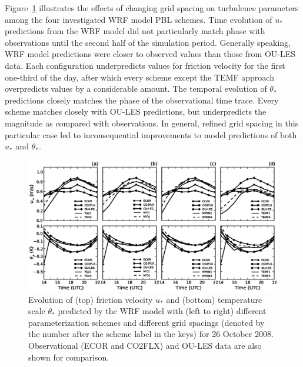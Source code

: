 Figure~\ref{figure421} illustrates the effects of changing grid spacing on turbulence parameters among the four investigated WRF model PBL schemes. Time evolution of $u_*$ predictions from the WRF model did not particularly match phase with observations until the second half of the simulation period. Generally speaking, WRF model predictions were closer to observed values than those from OU-LES data. Each configuration underpredicts values for friction velocity for the first one-third of the day, after which every scheme except the TEMF approach overpredicts values by a considerable amount. The temporal evolution of $\theta_*$ predictions closely matches the phase of the observational time trace. Every scheme matches closely with OU-LES predictions, but underpredicts the magnitude as compared with observations. In general, refined grid spacing in this particular case led to inconsequential improvements to model predictions of both $u_*$ and $\theta_*$. 


\begin{figure}[ht!]
\begin{center}
\includegraphics[width=\textwidth]{figures/chapter4/ust_tst_grid_20081026}
\end{center}
\caption{Evolution of (top) friction velocity $u_*$ and (bottom) temperature scale $\theta_*$ predicted by the WRF model with (left to right) different parameterization schemes and different grid spacings (denoted by the number after the scheme label in the keys) for 26 October 2008. Observational (ECOR and CO2FLX) and OU-LES data are also shown for comparison.}
\label{figure421}
\end{figure}


